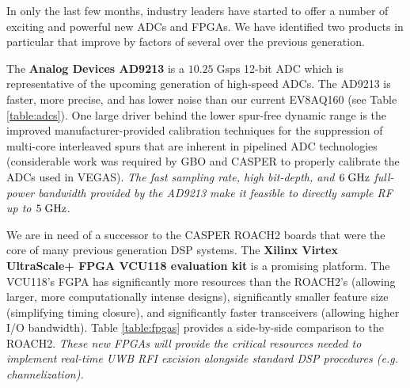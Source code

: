 \documentclass[10pt]{myNSF}
\begin{document}
\label{sec:hardware}

In only the last few months, industry leaders have started to offer a
number of exciting and powerful new ADCs and FPGAs.  We have
identified two products in particular that improve by factors of
several over the previous generation.
\begin{enumerate*}
\item{The \textbf{Analog Devices AD9213} is a $10.25\; \mathrm{Gsps}$
  12-bit ADC which is representative of the upcoming generation of
  high-speed ADCs.  The AD9213 is faster, more precise, and has lower
  noise than our current EV8AQ160 (see Table \ref{table:adcs}).  One
  large driver behind the lower spur-free dynamic range is the
  improved manufacturer-provided calibration techniques for the
  suppression of multi-core interleaved spurs that are inherent in
  pipelined ADC technologies (considerable work was required by GBO
  and CASPER to properly calibrate the ADCs used in VEGAS).  \emph{The
    fast sampling rate, high bit-depth, and $6\; \textrm{GHz}$ full-power
    bandwidth provided by the AD9213 make it feasible to directly
    sample RF up to $5\; \textrm{GHz}$.}}
\item{We are in need of a successor to the CASPER ROACH2 boards that
  were the core of many previous generation DSP systems.  The
  \textbf{Xilinx Virtex UltraScale+ FPGA VCU118 evaluation kit} is a
  promising platform.  The VCU118's FGPA has significantly more
  resources than the ROACH2's (allowing larger, more computationally
  intense designs), significantly smaller feature size (simplifying
  timing closure), and significantly faster transceivers (allowing
  higher I/O bandwidth).  Table \ref{table:fpgas} provides a
  side-by-side comparison to the ROACH2.  \emph{These new FPGAs will
    provide the critical resources needed to implement real-time UWB
    RFI excision alongside standard DSP procedures
    (e.g. channelization).}}
\end{enumerate*}
\end{document}
